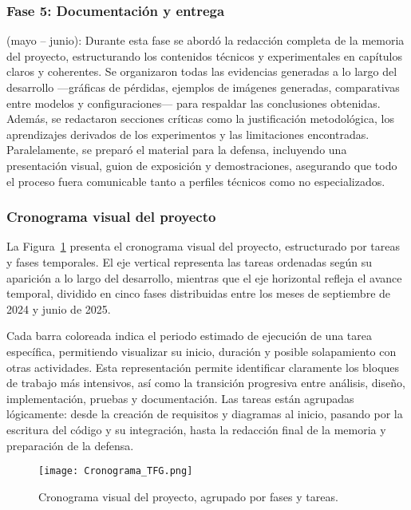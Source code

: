 \subsubsection{Fase 5: Documentación y entrega}
(mayo – junio):
Durante esta fase se abordó la redacción completa de la memoria del proyecto, estructurando los contenidos técnicos y experimentales en capítulos claros y coherentes. Se organizaron todas las evidencias generadas a lo largo del desarrollo —gráficas de pérdidas, ejemplos de imágenes generadas, comparativas entre modelos y configuraciones— para respaldar las conclusiones obtenidas. Además, se redactaron secciones críticas como la justificación metodológica, los aprendizajes derivados de los experimentos y las limitaciones encontradas. Paralelamente, se preparó el material para la defensa, incluyendo una presentación visual, guion de exposición y demostraciones, asegurando que todo el proceso fuera comunicable tanto a perfiles técnicos como no especializados.


\subsubsection{Cronograma visual del proyecto}

La Figura~\ref{fig:cronograma} presenta el cronograma visual del proyecto, estructurado por tareas y fases temporales. El eje vertical representa las tareas ordenadas según su aparición a lo largo del desarrollo, mientras que el eje horizontal refleja el avance temporal, dividido en cinco fases distribuidas entre los meses de septiembre de 2024 y junio de 2025.

Cada barra coloreada indica el periodo estimado de ejecución de una tarea específica, permitiendo visualizar su inicio, duración y posible solapamiento con otras actividades. Esta representación permite identificar claramente los bloques de trabajo más intensivos, así como la transición progresiva entre análisis, diseño, implementación, pruebas y documentación. Las tareas están agrupadas lógicamente: desde la creación de requisitos y diagramas al inicio, pasando por la escritura del código y su integración, hasta la redacción final de la memoria y preparación de la defensa.

\begin{figure}[H]
    \centering
    \texttt{[image: Cronograma\_TFG.png]}
    \caption{Cronograma visual del proyecto, agrupado por fases y tareas.}
    \label{fig:cronograma}
\end{figure}


